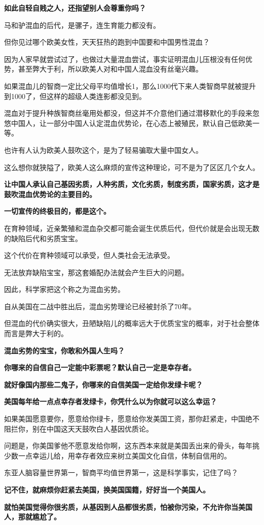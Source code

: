 \documentclass[UTF8, 11pt, oneside]{ctexart}
\newcommand{\zd}[1]{\textbf{\textcolor[RGB]{123,12,0}{#1}}} %
\begin{document}
\zd{如此自轻自贱之人，还指望别人会尊重你吗？}

马和驴混血的后代，是骡子，连生育能力都没有。

但你见过哪个欧美女性，天天狂热的跑到中国要和中国男性混血？

因为人家早就尝试过了，也做过大量混血尝试，事实证明混血儿压根没有任何优势，甚至弊大于利，所以欧美人对和中国人混血没有丝毫兴趣。

如果混血儿的智商一定比父母平均值增长1，那么1000代下来人类智商早就被提升到1000了，但这样的超级人类连影都没见到。

混血对于提升种族智商丝毫用处都没，但这并不介意他们通过潜移默化的手段来忽悠中国人，让一部分中国人认定混血优势论，在心态上被殖民，默认自己低欧美一等。

也许有人认为欧美人鼓吹这个，是为了轻易骗取大量中国女人。

这么想你就狭隘了，欧美人这么麻烦的宣传这种理论，可不是为了区区几个女人。

\zd{让中国人承认自己基因劣质，人种劣质，文化劣质，制度劣质，国家劣质，这才是鼓吹混血优势论的主要目的。}

\zd{一切宣传的终极目的，都是这个。}

在育种领域，近亲繁殖和混血杂交都可能会诞生优质后代，但代价就是会出现无数的缺陷后代和劣质宝宝。

这个代价在育种领域可以承受，但人类社会无法承受。

无法放弃缺陷宝宝，那这套婚配办法就会产生巨大的问题。

因此，科学家把这个称之为混血劣势。

自从美国在二战中胜出后，混血劣势理论已经被封杀了70年。

但混血的代价确实很大，丑陋缺陷儿的概率远大于优质宝宝的概率，对于社会整体而言是弊大于利的。

\zd{混血劣势的宝宝，你敢和外国人生吗？ }

\zd{你哪来的自信自己一定能中彩票呢？默认自己一定是幸存者。}

\zd{就好像国内那些二鬼子，你哪来的自信美国一定给你发绿卡呢？}

\zd{美国每年给一点点幸存者发绿卡，你凭什么以为你就可以这么幸运？}

如果美国愿意要你，愿意给你绿卡，愿意给你发美国工资，那你赶紧走，中国绝不阻拦你，别在中国这天天鼓吹白人基因优质论。

问题是，你美国爹他不愿意发给你啊，这东西本来就是美国丢出来的骨头，每年挑少数一点幸运儿给，用幸存者效应来树立美国文化自信，体制自信用的。

东亚人脑容量世界第一，智商平均值世界第一，这是科学事实，记住了吗？

\zd{记不住，就麻烦你赶紧去美国，换美国国籍，好好当一个美国人。}

\zd{就怕美国觉得你很劣质，从基因到人品都很劣质，怕被你污染，不允许你当美国人，那就尴尬了。}
\end{document}
